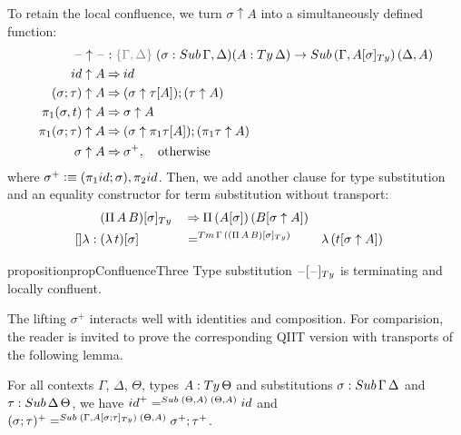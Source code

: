 \documentclass[a4paper,UKenglish,numberwithinsect,cleveref,thm-restate]{lipics-v2021}
\newcommand{\danger}{\marginpar[\hfill\dbend]{\dbend\hfill}}
\begin{document}
To retain the local confluence, we turn $\sigma \uparrow A$ into a simultaneously defined function:
\begin{alignat}{3}
  \blank\uparrow \blank & : \implicit{\Gamma, \Delta}\; (\sigma : \Sub\,\Gamma,\Delta) (A : \Ty\,\Delta) \to \Sub\,(\Gamma, \subTy{A}{\sigma})\, (\Delta, A) \label{eq:type-of-lifting} \\
\idS                \uparrow A & \reduce \idS \nonumber \\
(\sigma ; \tau)     \uparrow A & \reduce (\sigma \uparrow \sub{\tau}{A} ) ; (\tau \uparrow A) \nonumber \\
\pi_1(\sigma, t)    \uparrow A & \reduce \sigma \uparrow A \nonumber \\
\pi_1(\sigma; \tau) \uparrow A & \reduce (\sigma \uparrow \sub{\pi_1 \tau}{A}) ; (\pi_1 \tau \uparrow A)\nonumber \\
\sigma              \uparrow A & \reduce \sigma^+ , \quad \text{otherwise} \nonumber
\end{alignat}
where $\sigma^+ \defeq (\pi_1\idS ; \sigma), \pi_2\idS$.
Then, we add another clause for type substitution and an equality constructor for term substitution without transport:
\begin{alignat}{5}
                     & \subTy{(\Pi\,A\,B)}{\sigma} && \reduce \Pi\,(\sub{A}{\sigma})\,(\sub{B}{\sigma\uparrow A}) \label{eq:def-type-subst-9} \\
  \mathsf{[]\lambda} :{} & \sub{(\lambda\,t)}{\sigma} && =^{\Tm\,\Gamma\,(\subTy{(\Pi\,A\,B)}{\sigma})} && \lambda\,(\sub{t}{\sigma \uparrow A}) \nonumber
\end{alignat}


\begin{restatable}{proposition}{propConfluenceThree}\label{prop:local-confluence-3}
  Type substitution $\subTy{\blank}{\blank}$ is terminating and locally confluent.
    \danger
\end{restatable}

The lifting $\sigma^+$ interacts well with identities and composition.
For comparision, the reader is invited to prove the corresponding QIIT version with transports of the following lemma.
%
\begin{lemma} \label{lem:lifting}
  For all contexts $\Gamma$, $\Delta$, $\Theta$, types $A : \Ty\,\Theta$ and substitutions $\sigma : \Sub\,\Gamma\,\Delta$ and $\tau : \Sub\,\Delta\,\Theta$, we have $\idS^+ =^{\Sub\;(\Theta, A)\;(\Theta, A)} \idS$ and $(\sigma; \tau)^+     =^{\Sub\;(\Gamma, \subTy{A}{\sigma; \tau})\;(\Theta, A)} \sigma^+ ; \tau^+$.
\end{lemma}
\end{document}
